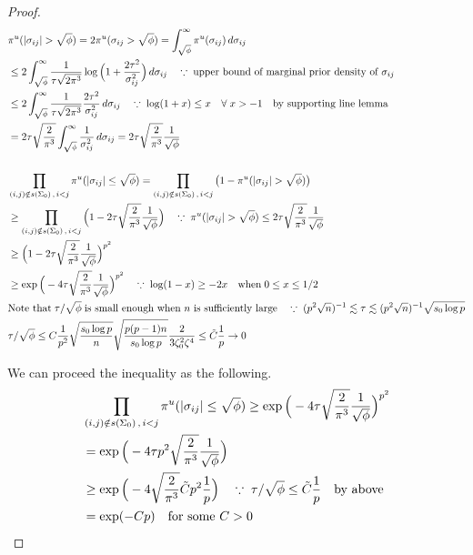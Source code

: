 \begin{proof}
    \begin{align*}
        &\pi^u(\abs{\sigma_{ij}}>\sqrt \phi) = 2\pi^u(\sigma_{ij}>\sqrt \phi) = \int_{\sqrt\phi}^\infty \pi^u(\sigma_{ij})\, d\sigma_{ij}\\
        &\leq 2\int_{\sqrt\phi}^\infty \frac{1}{\tau \sqrt{2\pi^3}}\log\Big(1+\frac{2\tau^2}{\sigma_{ij}^2} \Big) \,d\sigma_{ij} \quad \because \; \text{upper bound of marginal prior density of $\sigma_{ij}$} \\
        &\leq 2\int_{\sqrt \phi}^\infty \frac{1}{\tau \sqrt{2\pi^3}} \frac{2\tau^2}{\sigma_{ij}^2} \, d\sigma_{ij} \quad \because \; \log(1+x)\leq x \quad \forall \; x>-1 \quad \text{by supporting line lemma}\\
        &= 2\tau \sqrt{\frac{2}{\pi^3}} \int_{\sqrt{\phi}}^\infty \frac{1}{\sigma_{ij}^2}\, d\sigma_{ij} = 2\tau \sqrt{\frac{2}{\pi^3}} \frac{1}{\sqrt{\phi}} \\
        &\\
        &\prod_{(i,j) \notin s(\Sigma_0)\, ,\, i<j}\pi^u(\abs{\sigma_{ij}}\leq \sqrt \phi) = \prod_{(i,j) \notin s(\Sigma_0)\, ,\, i<j} \big(1 - \pi^u(\abs{\sigma_{ij}}>\sqrt{\phi})\big) \\
        &\geq \prod_{(i,j) \notin s(\Sigma_0)\, ,\, i<j} \Big(1-  2\tau \sqrt{\frac{2}{\pi^3}} \frac{1}{\sqrt{\phi}} \Big) \quad \because \; \pi^u(\abs{\sigma_{ij}}>\sqrt \phi) \leq 2\tau \sqrt{\frac{2}{\pi^3}} \frac{1}{\sqrt{\phi}}  \\
        &\geq \Big(1-  2\tau \sqrt{\frac{2}{\pi^3}} \frac{1}{\sqrt{\phi}} \Big)^{p^2} \\
        &\geq \exp\Big(-4\tau \sqrt{\frac{2}{\pi^3}} \frac{1}{\sqrt{\phi}} \Big)^{p^2} \quad \because \; \log(1-x)\geq -2x \quad \text{when}\; 0\leq x\leq 1/2 \\
        &\text{Note that} \; \tau/\sqrt{\phi} \; \text{is small enough when $n$ is sufficiently large} \quad \because\; (p^2\sqrt{n})^{-1}\lesssim \tau \lesssim (p^2\sqrt{n})^{-1}\sqrt{s_0\log p} \\
        &\tau/\sqrt{\phi} \leq C \frac{1}{p^2}\sqrt{\frac{s_0\log p}{n}}\sqrt{\frac{p(p-1)n}{s_0\log p}}\frac{2}{3\zeta_0^2\zeta^4} \leq \tilde C \frac{1}{p} \rightarrow 0
    \end{align*}

    We can proceed the inequality as the following.
    \begin{align*}
        &\prod_{(i,j) \notin s(\Sigma_0)\, ,\, i<j}\pi^u(\abs{\sigma_{ij}}\leq \sqrt \phi) \geq \exp\Big(-4\tau \sqrt{\frac{2}{\pi^3}} \frac{1}{\sqrt{\phi}} \Big)^{p^2} \\
        &= \exp\Big(-4\tau p^2 \sqrt{\frac{2}{\pi^3}} \frac{1}{\sqrt{\phi}} \Big) \\
        &\geq \exp\Big(-4\sqrt{\frac{2}{\pi^3}}\tilde C p^2\frac 1p \Big) \quad \because \; \tau/\sqrt{\phi}\leq \tilde C \frac 1p \quad \text{by above} \\
        &= \exp(-Cp) \quad \text{for some } C>0
    \end{align*}


\end{proof}
